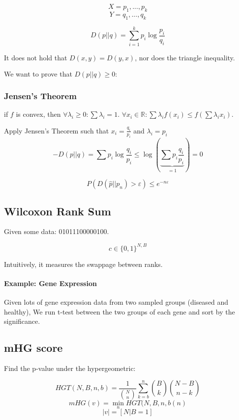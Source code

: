 \documentclass[a4paper]{article}
\begin{document}
\[X=p_1,...,p_k\]
\[Y=q_1,...,q_k\]

\[D(p || q) = \sum_{i=1}^k p_i \log \frac{p_i}{q_i} \]

It does not hold that $D(x,y)=D(y,x)$, nor does the triangle inequality.

We want to prove that $D(p || q) \ge 0$:

\subsubsection{Jensen's Theorem}

if $f$ is convex, then $\forall \lambda_i \ge 0 : \sum \lambda_i = 1$.
$\forall x_i \in \mathbb{R} : \sum \lambda_i f(x_i) \le f(\sum \lambda_i x_i)$.

Apply Jensen's Theorem such that $x_i=\frac{q_i}{p_i}$ and $\lambda_i=p_i$
\[- D(p || q) = \sum p_i \log \frac{q_i}{p_i} \le \log\left(\underbrace{\sum p_i \frac{q_i}{p_i}}_{=1}\right)=0\]



\[P(D(\hat{p}||p_n) > \varepsilon) \le e^{-n\varepsilon}\]

\subsection{Wilcoxon Rank Sum}

Given some data: 01011100000100.

\[c \in \{0,1\}^{N,B}\]

Intuitively, it measures the swappage between ranks.

\paragraph{Example: Gene Expression}
Given lots of gene expression data from two sampled groups (diseased and healthy),
We run t-test between the two groups of each gene and sort by the significance.

\subsection{mHG score}
Find the p-value under the hypergeometric:

\[HGT(N,B,n,b)=\frac{1}{\binom{N}{n}} \sum_{k=b}^n \binom{B}{k} \binom{N-B}{n-k}\]
\[mHG(v)=\min_n HGT(N,B,n,b(n)\]
\[|v|=[N | B=1]\]

\end{document}
